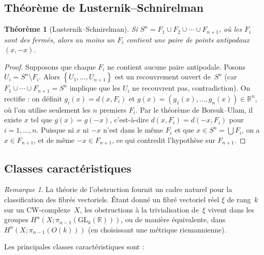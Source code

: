 \documentclass[12pt,a4paper,openany]{book}
\theoremstyle{definition}
\theoremstyle{plain}
\newtheorem{theoreme}[definition]{Théorème}
\theoremstyle{remark}
\newtheorem{remarque}[definition]{Remarque}
\newcommand{\R}{\mathbb{R}}
\newcommand{\set}[1]{\left\{#1\right\}}
\begin{document}
\subsection{Théorème de Lusternik--Schnirelman}\label{subsec:lusternik-schnirelman}

\begin{theoreme}[Lusternik--Schnirelman]\label{thm:lusternik-schnirelman}
  Si $S^n = F_1 \cup F_2 \cup \cdots \cup F_{n+1}$, où les $F_i$ sont des fermés,
  alors au moins un $F_i$ contient une paire de points antipodaux $(x, -x)$.
\end{theoreme}

\begin{proof}
  Supposons que chaque $F_i$ ne contient aucune paire antipodale. Posons
  $U_i = S^n \setminus F_i$. Alors $\set{U_1, \ldots, U_{n+1}}$ est un recouvrement
  ouvert de~$S^n$ (car $F_1 \cup \cdots \cup F_{n+1} = S^n$ implique que les $U_i$
  ne recouvrent pas, contradiction). On rectifie : on définit
  $g_i(x) = d(x, F_i)$ et $g(x) = (g_1(x), \ldots, g_n(x)) \in \R^n$, où l'on
  utilise seulement les $n$ premiers $F_i$. Par le théorème de Borsuk--Ulam, il
  existe $x$ tel que $g(x) = g(-x)$, c'est-à-dire $d(x, F_i) = d(-x, F_i)$ pour
  $i = 1, \ldots, n$. Puisque ni $x$ ni $-x$ n'est dans le même $F_i$ et que
  $x \in S^n = \bigcup F_i$, on a $x \in F_{n+1}$, et de même $-x \in F_{n+1}$,
  ce qui contredit l'hypothèse sur $F_{n+1}$.
\end{proof}

\subsection{Classes caractéristiques}\label{subsec:classes-caract}

\begin{remarque}\label{rem:classes-caract}
  La théorie de l'obstruction fournit un cadre naturel pour la classification des
  fibrés vectoriels. Étant donné un fibré vectoriel réel $\xi$ de rang~$k$ sur un
  CW-complexe~$X$, les obstructions à la trivialisation de~$\xi$ vivent dans les
  groupes $H^n(X; \pi_{n-1}(\mathrm{GL}_k(\R)))$, ou de manière équivalente,
  dans $H^n(X; \pi_{n-1}(O(k)))$ (en choisissant une métrique riemannienne).
\end{remarque}

Les principales classes caractéristiques sont :
\end{document}
